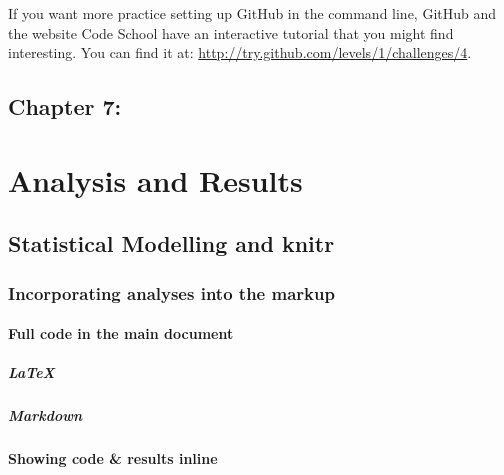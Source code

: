\documentclass[ChapterTOCs,krantz1]{krantz}\usepackage{graphicx, color}
\begin{document}
If you want more practice setting up GitHub in the command
line, GitHub and the website Code School have an interactive
tutorial that you might find interesting. You can find it at:
\url{http://try.github.com/levels/1/challenges/4}.




\chapter{Chapter 7:}



\part{Analysis and Results}





\chapter{Statistical Modelling and knitr} \label{StatsModel}

\section{Incorporating analyses into the markup}

\subsection{Full code in the main document}

\subsubsection{\LaTeX  }

\subsubsection{Markdown}

\subsection{Showing code \& results inline}
\end{document}

